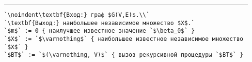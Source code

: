 \vspace{5pt} \hrule

\begin{lstlisting}[caption={Поиск с возвратами}, label=p350_1, escapechar=`]
`\noindent\textbf{Вход:} граф $G(V,E)$.\\`
`\textbf{Выход:} наибольшее независимое множество $X$.`
`$m$` := 0 { наилучшее известное значение `$\beta_0$` }
`$X$` := `$\varnothing$` { наибольшее известное независимое множество `$X$` }
`$BT$` := `$(\varnothing, V)$` { вызов рекурсивной процедуры `$BT$` }
\end{lstlisting}
